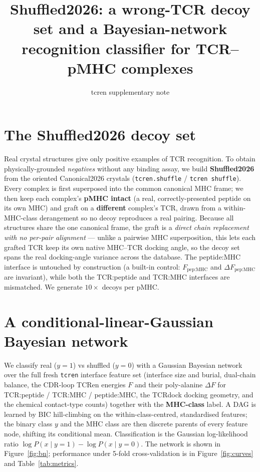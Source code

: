\documentclass[11pt]{article}
\title{\textbf{Shuffled2026}: a wrong-TCR decoy set and a Bayesian-network\\
recognition classifier for TCR--pMHC complexes}
\author{tcren supplementary note}
\date{}
\begin{document}
\maketitle

\section{The Shuffled2026 decoy set}
Real crystal structures give only positive examples of TCR recognition. To obtain physically-grounded
\emph{negatives} without any binding assay, we build \textbf{Shuffled2026} from the oriented Canonical2026
crystals (\texttt{tcren.shuffle} / \texttt{tcren shuffle}). Every complex is first superposed into the common
canonical MHC frame; we then keep each complex's \textbf{pMHC intact} (a real, correctly-presented peptide on
its own MHC) and graft on a \textbf{different} complex's TCR, drawn from a within-MHC-class derangement so no
decoy reproduces a real pairing. Because all structures share the one canonical frame, the graft is a
\emph{direct chain replacement with no per-pair alignment} --- unlike a pairwise MHC superposition, this lets
each grafted TCR keep its own native MHC--TCR docking angle, so the decoy set spans the real docking-angle
variance across the database. The peptide:MHC interface is untouched by construction (a built-in control:
$F_{\text{pep:MHC}}$ and $\Delta F_{\text{pep:MHC}}$ are invariant), while both the TCR:peptide and TCR:MHC
interfaces are mismatched. We generate $10\times$ decoys per pMHC.

\section{A conditional-linear-Gaussian Bayesian network}
We classify real ($y=1$) vs shuffled ($y=0$) with a Gaussian Bayesian network over the full fresh
\texttt{tcren} interface feature set (interface size and burial, dual-chain balance, the CDR-loop TCRen
energies $F$ and their poly-alanine $\Delta F$ for TCR:peptide / TCR:MHC / peptide:MHC, the TCRdock docking
geometry, and the chemical contact-type counts) together with the \textbf{MHC-class} label. A DAG is learned by
BIC hill-climbing on the within-class-centred, standardised features; the binary class $y$ and the MHC class
are then discrete parents of every feature node, shifting its conditional mean. Classification is the Gaussian
log-likelihood ratio $\log P(x\mid y{=}1)-\log P(x\mid y{=}0)$. The network is shown in
Figure~\ref{fig:bn}; performance under 5-fold cross-validation is in Figure~\ref{fig:curves} and
Table~\ref{tab:metrics}.
\end{document}
